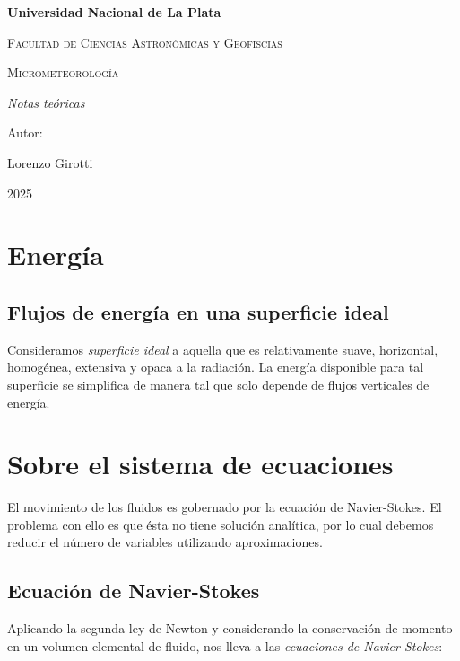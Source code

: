 \documentclass[openany]{book}
\begin{document}
\begin{titlepage}
    \centering
    {\bfseries\LARGE Universidad Nacional de La Plata \par}\vspace{1cm}
    {\scshape\Large Facultad de Ciencias Astronómicas y Geofíscias \par}\vspace{3cm}
    {\scshape\Huge Micrometeorología \par}\vspace{3cm}
    {\itshape\Large Notas teóricas \par}
    \vfill
    {\Large Autor: \par}
    {\Large Lorenzo Girotti \par}
    \vfill
    {\Large 2025 \par}
\end{titlepage}

\sffamily


\chapter{Energía}

\section{Flujos de energía en una superficie ideal}

Consideramos \emph{superficie ideal} a aquella que es relativamente 
suave, horizontal, homogénea, extensiva y opaca a la radiación. 
La energía disponible para tal superficie se simplifica de manera 
tal que solo depende de flujos verticales de energía.

\chapter{Sobre el sistema de ecuaciones}

\par El movimiento de los fluidos es gobernado por la ecuación de 
Navier-Stokes. El problema con ello es que ésta no tiene solución
analítica, por lo cual debemos reducir el número de variables utilizando
aproximaciones.

\section{Ecuación de Navier-Stokes}
Aplicando la segunda ley de Newton y considerando la 
conservación de momento en un volumen elemental de fluido, 
nos lleva a las \emph{ecuaciones de Navier-Stokes}:
\end{document}
